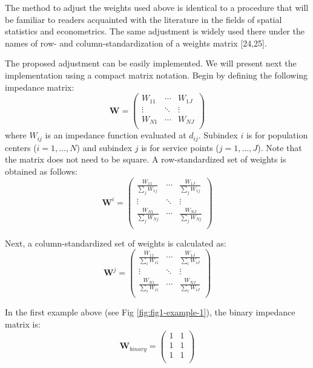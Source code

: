 \documentclass[10pt,letterpaper]{article}
\begin{document}
The method to adjust the weights used above is identical to a procedure
that will be familiar to readers acquainted with the literature in the
fields of spatial statistics and econometrics. The same adjustment is
widely used there under the names of row- and column-standardization of
a weights matrix {[}24,25{]}.

The proposed adjustment can be easily implemented. We will present next
the implementation using a compact matrix notation. Begin by defining
the following impedance matrix: \[
\mathbf{W} = \left(\begin{array}{ccc}
            W_{11} & \cdots & W_{1J}\\
            \vdots & \ddots & \vdots\\
            W_{N1} & \cdots & W_{NJ}\\
        \end{array}
        \right)
\] where \(W_{ij}\) is an impedance function evaluated at \(d_{ij}\).
Subindex \(i\) is for population centers (\(i=1,\dots,N\)) and subindex
\(j\) is for service points (\(j=1,\dots,J\)). Note that the matrix does
not need to be square. A row-standardized set of weights is obtained as
follows: \[
\mathbf{W}^{i} = \left(\begin{array}{ccc}
            \frac{W_{11}}{\sum_jW_{1j}} & \cdots & \frac{W_{1J}}{\sum_jW_{1j}}\\
            \vdots & \ddots & \vdots\\
            \frac{W_{N1}}{\sum_jW_{Nj}} & \cdots & \frac{W_{NJ}}{\sum_jW_{Nj}}\\
        \end{array}
        \right)
\]

Next, a column-standardized set of weights is calculated as: \[
\mathbf{W}^{j} = \left(\begin{array}{ccc}
            \frac{W_{11}}{\sum_iW_{i1}} & \cdots & \frac{W_{1J}}{\sum_iW_{iJ}}\\
            \vdots & \ddots & \vdots\\
            \frac{W_{N1}}{\sum_iW_{i1}} & \cdots & \frac{W_{NJ}}{\sum_iW_{iJ}}\\
        \end{array}
        \right)
\]

In the first example above (see Fig \ref{fig:fig1-example-1}), the
binary impedance matrix is: \[
\mathbf{W}_{binary} = \left(\begin{array}{ccc}
            1 & 1\\
            1 & 1\\
            1 & 1\\
        \end{array}
        \right)
\]
\end{document}
